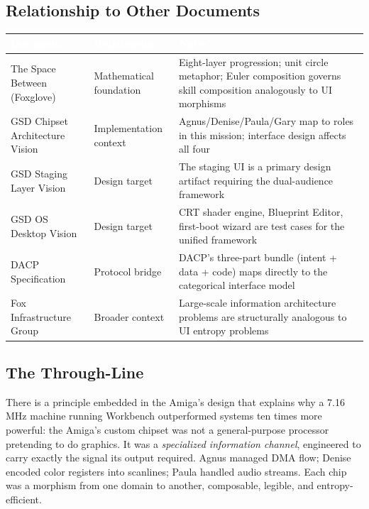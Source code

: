 \documentclass[11pt,letterpaper]{article}
\newcommand{\tableheader}[1]{\textbf{\sffamily\textcolor{white}{#1}}}
\begin{document}
\subsection{Relationship to Other Documents}

\begin{center}
\begin{tabularx}{\textwidth}{L{4.5cm}L{4cm}X}
\toprule
{}
\tableheader{Document} & \tableheader{Relationship} & \tableheader{Notes} \\
\midrule
The Space Between (Foxglove) & Mathematical foundation & Eight-layer progression; unit circle metaphor; Euler composition governs skill composition analogously to UI morphisms \\
GSD Chipset Architecture Vision & Implementation context & Agnus/Denise/Paula/Gary map to roles in this mission; interface design affects all four \\
GSD Staging Layer Vision & Design target & The staging UI is a primary design artifact requiring the dual-audience framework \\
GSD OS Desktop Vision & Design target & CRT shader engine, Blueprint Editor, first-boot wizard are test cases for the unified framework \\
DACP Specification & Protocol bridge & DACP's three-part bundle (intent + data + code) maps directly to the categorical interface model \\
Fox Infrastructure Group & Broader context & Large-scale information architecture problems are structurally analogous to UI entropy problems \\
\bottomrule
\end{tabularx}
\end{center}

\subsection{The Through-Line}

There is a principle embedded in the Amiga's design that explains why a 7.16 MHz machine running Workbench outperformed systems ten times more powerful: the Amiga's custom chipset was not a general-purpose processor pretending to do graphics. It was a \textit{specialized information channel}, engineered to carry exactly the signal its output required. Agnus managed DMA flow; Denise encoded color registers into scanlines; Paula handled audio streams. Each chip was a morphism from one domain to another, composable, legible, and entropy-efficient.
\end{document}
